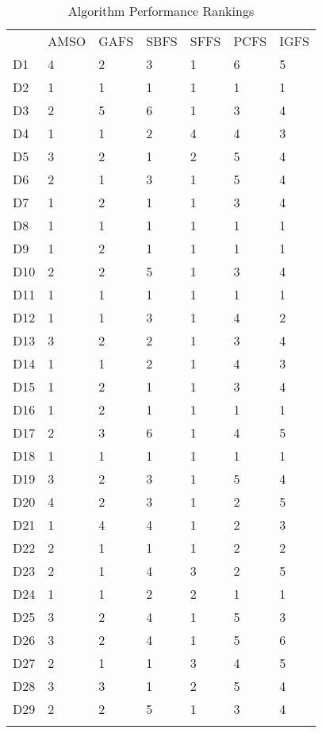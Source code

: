 \begin{table}
\caption{Algorithm Performance Rankings}
\label{tbl:algorithm:rank}
\begin{tabular}{lllllll}
\noalign{\smallskip}\hline\noalign{\smallskip}
&AMSO&GAFS&SBFS&SFFS&PCFS&IGFS\\
\noalign{\smallskip}\hline
D1&4&2&3&1&6&5\\
D2&1&1&1&1&1&1\\
D3&2&5&6&1&3&4\\
D4&1&1&2&4&4&3\\
D5&3&2&1&2&5&4\\
D6&2&1&3&1&5&4\\
D7&1&2&1&1&3&4\\
D8&1&1&1&1&1&1\\
D9&1&2&1&1&1&1\\
D10&2&2&5&1&3&4\\
D11&1&1&1&1&1&1\\
D12&1&1&3&1&4&2\\
D13&3&2&2&1&3&4\\
D14&1&1&2&1&4&3\\
D15&1&2&1&1&3&4\\
D16&1&2&1&1&1&1\\
D17&2&3&6&1&4&5\\
D18&1&1&1&1&1&1\\
D19&3&2&3&1&5&4\\
D20&4&2&3&1&2&5\\
D21&1&4&4&1&2&3\\
D22&2&1&1&1&2&2\\
D23&2&1&4&3&2&5\\
D24&1&1&2&2&1&1\\
D25&3&2&4&1&5&3\\
D26&3&2&4&1&5&6\\
D27&2&1&1&3&4&5\\
D28&3&3&1&2&5&4\\
D29&2&2&5&1&3&4\\
\noalign{\smallskip}\hline
\end{tabular}
\end{table}
